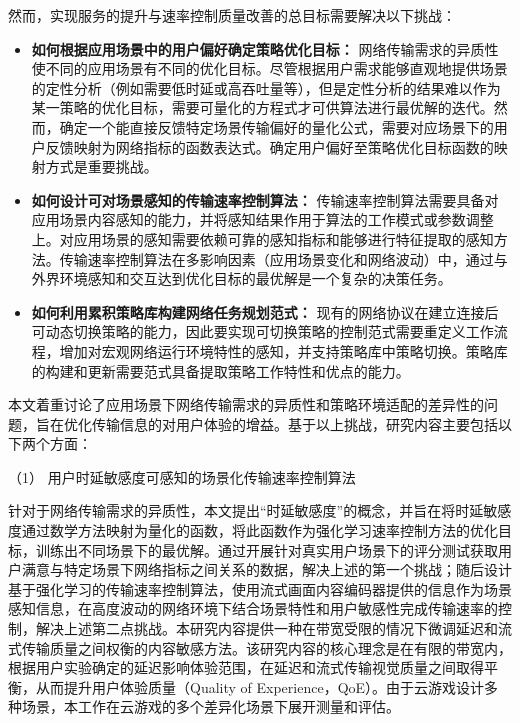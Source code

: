 然而，实现服务的提升与速率控制质量改善的总目标需要解决以下挑战：
\begin{itemize}
    \item \textbf{如何根据应用场景中的用户偏好确定策略优化目标：} 网络传输需求的异质性使不同的应用场景有不同的优化目标。尽管根据用户需求能够直观地提供场景的定性分析（例如需要低时延或高吞吐量等），但是定性分析的结果难以作为某一策略的优化目标，需要可量化的方程式才可供算法进行最优解的迭代。然而，确定一个能直接反馈特定场景传输偏好的量化公式，需要对应场景下的用户反馈映射为网络指标的函数表达式。确定用户偏好至策略优化目标函数的映射方式是重要挑战。
    
    \item \textbf{如何设计可对场景感知的传输速率控制算法：} 传输速率控制算法需要具备对应用场景内容感知的能力，并将感知结果作用于算法的工作模式或参数调整上。对应用场景的感知需要依赖可靠的感知指标和能够进行特征提取的感知方法。传输速率控制算法在多影响因素（应用场景变化和网络波动）中，通过与外界环境感知和交互达到优化目标的最优解是一个复杂的决策任务。

    \item \textbf{如何利用累积策略库构建网络任务规划范式：} 现有的网络协议在建立连接后可动态切换策略的能力，因此要实现可切换策略的控制范式需要重定义工作流程，增加对宏观网络运行环境特性的感知，并支持策略库中策略切换。策略库的构建和更新需要范式具备提取策略工作特性和优点的能力。
    
\end{itemize}

本文着重讨论了应用场景下网络传输需求的异质性和策略环境适配的差异性的问题，旨在优化传输信息的对用户体验的增益。基于以上挑战，研究内容主要包括以下两个方面：

（1） 用户时延敏感度可感知的场景化传输速率控制算法

针对于网络传输需求的异质性，本文提出“时延敏感度”的概念，并旨在将时延敏感度通过数学方法映射为量化的函数，将此函数作为强化学习速率控制方法的优化目标，训练出不同场景下的最优解。通过开展针对真实用户场景下的评分测试获取用户满意与特定场景下网络指标之间关系的数据，解决上述的第一个挑战；随后设计基于强化学习的传输速率控制算法，使用流式画面内容编码器提供的信息作为场景感知信息，在高度波动的网络环境下结合场景特性和用户敏感性完成传输速率的控制，解决上述第二点挑战。本研究内容提供一种在带宽受限的情况下微调延迟和流式传输质量之间权衡的内容敏感方法。该研究内容的核心理念是在有限的带宽内，根据用户实验确定的延迟影响体验范围，在延迟和流式传输视觉质量之间取得平衡，从而提升用户体验质量（Quality of Experience，QoE）。由于云游戏设计多种场景，本工作在云游戏的多个差异化场景下展开测量和评估。

